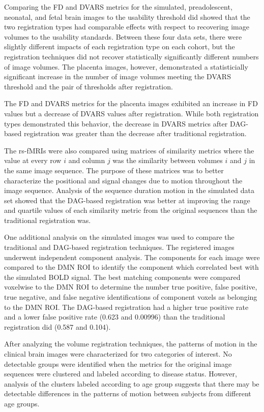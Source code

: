 Comparing the FD and DVARS metrics for the simulated, preadolescent, neonatal, and fetal brain images to the usability threshold did showed that the two registration types had comparable effects with respect to recovering image volumes to the usability standards. Between these four data sets, there were slightly different impacts of each registration type on each cohort, but the registration techniques did not recover statistically significantly different numbers of image volumes. The placenta images, however, demonstrated a statisticially significant increase in the number of image volumes meeting the DVARS threshold and the pair of thresholds after registration.

The FD and DVARS metrics for the placenta images exhibited an increase in FD values but a decrease of DVARS values after registration. While both registration types demonstrated this behavior, the decrease in DVARS metrics after DAG-based registration was greater than the decrease after traditional registration.

The rs-fMRIs were also compared using matrices of similarity metrics where the value at every row $i$ and column $j$ was the similarity between volumes $i$ and $j$ in the same image sequence. The purpose of these matrices was to better characterize the positional and signal changes due to motion throughout the image sequence. Analysis of the sequence duration motion in the simulated data set showed that the DAG-based registration was better at improving the range and quartile values of each similarity  metric from the original sequences than the traditional registration was.

One additional analysis on the simulated images was used to compare the traditional and DAG-based registration techniques. The registered images underwent independent component analysis. The components for each image were compared to the DMN ROI to identify the component which correlated best with the simulated BOLD signal. The best matching components were compared voxelwise to the DMN ROI to determine the number true positive, false positive, true negative, and false negative identifications of component voxels as belonging to the DMN ROI. The DAG-based registration had a higher true positive rate and a lower false positive rate (0.623 and 0.00996) than the traditional registration did (0.587 and 0.104).

After analyzing the volume registration techniques, the patterns of motion in the clinical brain images were characterized for two categories of interest. No detectable groups were identified when the metrics for the original image sequences were clustered and labeled according to disease status. However, analysis of the clusters labeled according to age group suggests that there may be detectable differences in the patterns of motion between subjects from different age groups.

